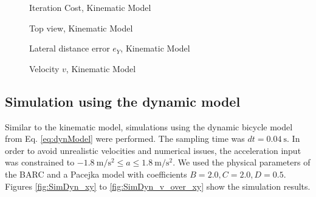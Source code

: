 \begin{figure}[ht]
	\centering
  	
  	\caption{Iteration Cost, Kinematic Model}
	\label{fig:SimKin_cost}
\end{figure}
\begin{figure}[ht]
	\centering
  	
	\caption{Top view, Kinematic Model}
	\label{fig:SimKin_xy}
\end{figure}
\begin{figure}[ht]
	\centering
  	
  	\caption{Lateral distance error $e_Y$, Kinematic Model}
	\label{fig:SimKin_eY}
\end{figure}
\begin{figure}[ht]
	\centering
  	
  	\caption{Velocity $v$, Kinematic Model}
	\label{fig:SimKin_v}
\end{figure}

\subsection{Simulation using the dynamic model}
Similar to the kinematic model, simulations using the dynamic bicycle model from Eq. \eqref{eq:dynModel} were performed. The sampling time was $dt=\SI{0.04}{\second}$. In order to avoid unrealistic velocities and numerical issues, the acceleration input was constrained to $-\SI{1.8}{\meter\per\square\second}\leq a \leq \SI{1.8}{\meter\per\square\second}$. We used the physical parameters of the BARC and a Pacejka model with coefficients $B=2.0, C=2.0, D = 0.5$. Figures \ref{fig:SimDyn_xy} to \ref{fig:SimDyn_v_over_xy} show the simulation results.\\
